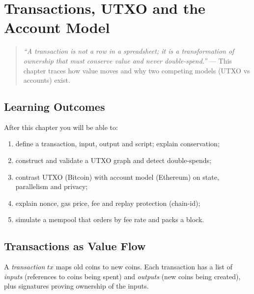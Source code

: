 \chapter{Transactions, UTXO and the Account Model}\label{ch:transactions}

\begin{quote}
\emph{``A transaction is not a row in a spreadsheet; it is a transformation of ownership that must conserve value and never double-spend.''} --- This chapter traces how value moves and why two competing models (UTXO vs accounts) exist.
\end{quote}

\noindent{}
\vspace{0.4em}

\section*{Learning Outcomes}
After this chapter you will be able to:
\begin{enumerate}[label=(L\arabic*)]
    \item define a transaction, input, output and script; explain conservation;
    \item construct and validate a UTXO graph and detect double-spends;
    \item contrast UTXO (Bitcoin) with account model (Ethereum) on state, parallelism and privacy;
    \item explain nonce, gas price, fee and replay protection (chain-id);
    \item simulate a mempool that orders by fee rate and packs a block.
\end{enumerate}

\section{Transactions as Value Flow}\label{sec:tx-flow}
A \emph{transaction} $tx$ maps old coins to new coins. Each transaction has a list of \emph{inputs} (references to coins being spent) and \emph{outputs} (new coins being created), plus signatures proving ownership of the inputs.

